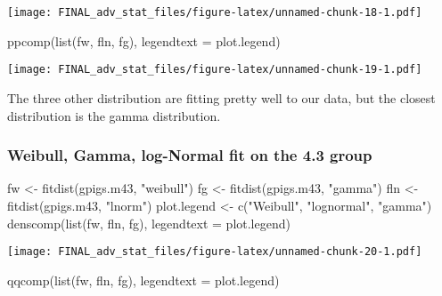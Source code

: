 \documentclass[
]{article}
\newenvironment{Shaded}{\begin{snugshade}}{\end{snugshade}}
\newcommand{\AttributeTok}[1]{\textcolor[rgb]{0.77,0.63,0.00}{#1}}
\newcommand{\FunctionTok}[1]{\textcolor[rgb]{0.00,0.00,0.00}{#1}}
\newcommand{\NormalTok}[1]{#1}
\newcommand{\OtherTok}[1]{\textcolor[rgb]{0.56,0.35,0.01}{#1}}
\newcommand{\StringTok}[1]{\textcolor[rgb]{0.31,0.60,0.02}{#1}}
\begin{document}
\texttt{[image: FINAL\_adv\_stat\_files/figure-latex/unnamed-chunk-18-1.pdf]}

\begin{Shaded}
\begin{Highlighting}[]
\FunctionTok{ppcomp}\NormalTok{(}\FunctionTok{list}\NormalTok{(fw, fln, fg), }\AttributeTok{legendtext =}\NormalTok{ plot.legend)}
\end{Highlighting}
\end{Shaded}

\texttt{[image: FINAL\_adv\_stat\_files/figure-latex/unnamed-chunk-19-1.pdf]}

The three other distribution are fitting pretty well to our data, but
the closest distribution is the gamma distribution.

\hypertarget{weibull-gamma-log-normal-fit-on-the-4.3-group}{%
\subsubsection{Weibull, Gamma, log-Normal fit on the 4.3
group}\label{weibull-gamma-log-normal-fit-on-the-4.3-group}}

\begin{Shaded}
\begin{Highlighting}[]
\NormalTok{fw }\OtherTok{\textless{}{-}} \FunctionTok{fitdist}\NormalTok{(gpigs.m43, }\StringTok{"weibull"}\NormalTok{)}
\NormalTok{fg }\OtherTok{\textless{}{-}} \FunctionTok{fitdist}\NormalTok{(gpigs.m43, }\StringTok{"gamma"}\NormalTok{) }
\NormalTok{fln }\OtherTok{\textless{}{-}} \FunctionTok{fitdist}\NormalTok{(gpigs.m43, }\StringTok{"lnorm"}\NormalTok{) }
\NormalTok{plot.legend }\OtherTok{\textless{}{-}} \FunctionTok{c}\NormalTok{(}\StringTok{"Weibull"}\NormalTok{, }\StringTok{"lognormal"}\NormalTok{, }\StringTok{"gamma"}\NormalTok{)}
\FunctionTok{denscomp}\NormalTok{(}\FunctionTok{list}\NormalTok{(fw, fln, fg), }\AttributeTok{legendtext =}\NormalTok{ plot.legend) }
\end{Highlighting}
\end{Shaded}

\texttt{[image: FINAL\_adv\_stat\_files/figure-latex/unnamed-chunk-20-1.pdf]}

\begin{Shaded}
\begin{Highlighting}[]
\FunctionTok{qqcomp}\NormalTok{(}\FunctionTok{list}\NormalTok{(fw, fln, fg), }\AttributeTok{legendtext =}\NormalTok{ plot.legend) }
\end{Highlighting}
\end{Shaded}
\end{document}
